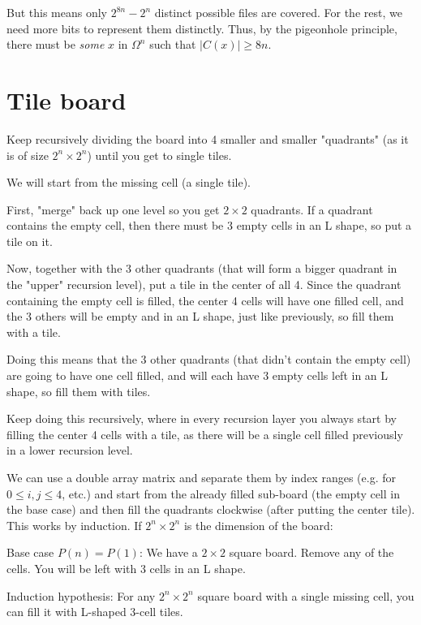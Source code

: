 \documentclass[11pt,letterpaper]{article}
\begin{document}
		But this means only $2^{8n} - 2^n$ distinct possible files are covered.
		For the rest, we need more bits to represent them distinctly.
		Thus, by the pigeonhole principle, there must be \textit{some} $x$ in $\Omega^n$ such that $\left|C(x)\right| \geq 8n$.
		
	\section{Tile board}
		Keep recursively dividing the board into 4 smaller and smaller "quadrants" (as it is of size $2^n \times 2^n$) until you get to single tiles.
		
		We will start from the missing cell (a single tile).
		
		First, "merge" back up one level so you get $2 \times 2$ quadrants.
		If a quadrant contains the empty cell, then there must be 3 empty cells in an L shape, so put a tile on it.
		
		Now, together with the 3 other quadrants (that will form a bigger quadrant in the "upper" recursion level), put a tile in the center of all 4.
		Since the quadrant containing the empty cell is filled, the center 4 cells will have one filled cell, and the 3 others will be empty and in an L shape, just like previously, so fill them with a tile.
		
		Doing this means that the 3 other quadrants (that didn't contain the empty cell) are going to have one cell filled, and will each have 3 empty cells left in an L shape, so fill them with tiles.
		
		Keep doing this recursively, where in every recursion layer you always start by filling the center 4 cells with a tile, as there will be a single cell filled previously in a lower recursion level.
		
		We can use a double array matrix and separate them by index ranges (e.g. for $0 \leq i,j \le 4$, etc.) and start from the already filled sub-board (the empty cell in the base case) and then fill the quadrants clockwise (after putting the center tile).\newline
		\linebreak This works by induction.
		If $2^n \times 2^n$ is the dimension of the board:
		
		Base case $P(n)=P(1)$: We have a $2 \times 2$ square board. Remove any of the cells. You will be left with 3 cells in an L shape.
		
		Induction hypothesis: For any $2^n \times 2^n$ square board with a single missing cell, you can fill it with L-shaped 3-cell tiles.
		
\end{document}

